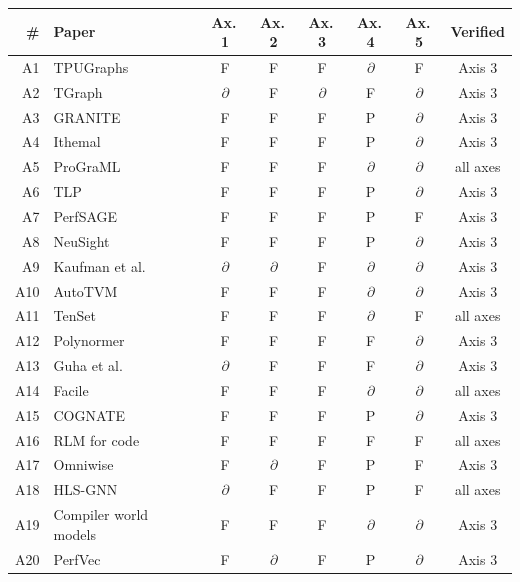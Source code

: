 \begin{tabular}{rlcccccc}
\toprule
\# & Paper & Ax.\,1 & Ax.\,2 & Ax.\,3 & Ax.\,4 & Ax.\,5 & Verified \\
\midrule
A1 & TPUGraphs~\cite{phothilimthana2023tpugraphs} & F & F & F & $\partial$ & F & Axis 3 \\
A2 & TGraph~\cite{khizbullin2024graph} & $\partial$ & F & $\partial$ & F & $\partial$ & Axis 3 \\
A3 & GRANITE~\cite{sykora2022granite} & F & F & F & P & $\partial$ & Axis 3 \\
A4 & Ithemal~\cite{mendis2019ithemal} & F & F & F & P & $\partial$ & Axis 3 \\
A5 & ProGraML~\cite{cummins2021programl} & F & F & F & $\partial$ & $\partial$ & all axes \\
A6 & TLP~\cite{zhai2022deep} & F & F & F & P & $\partial$ & Axis 3 \\
A7 & PerfSAGE~\cite{chai2023perfsage} & F & F & F & P & F & Axis 3 \\
A8 & NeuSight~\cite{lee2024forecasting} & F & F & F & P & $\partial$ & Axis 3 \\
A9 & Kaufman et al.~\cite{kaufman2021learned} & $\partial$ & $\partial$ & F & $\partial$ & $\partial$ & Axis 3 \\
A10 & AutoTVM~\cite{chen2018learning} & F & F & F & $\partial$ & $\partial$ & Axis 3 \\
A11 & TenSet~\cite{zheng2021tenset} & F & F & F & $\partial$ & F & all axes \\
A12 & Polynormer~\cite{deng2024polynormer} & F & F & F & F & $\partial$ & Axis 3 \\
A13 & Guha et al.~\cite{guha2025learned} & $\partial$ & F & F & F & $\partial$ & Axis 3 \\
A14 & Facile~\cite{abel2023facile} & F & F & F & $\partial$ & $\partial$ & all axes \\
A15 & COGNATE~\cite{sudusinghe2025cognate} & F & F & F & P & $\partial$ & Axis 3 \\
A16 & RLM for code~\cite{akhauri2025regression} & F & F & F & F & F & all axes \\
A17 & Omniwise~\cite{wang2025omniwise} & F & $\partial$ & F & P & F & Axis 3 \\
A18 & HLS-GNN~\cite{wu2022highlevel} & $\partial$ & F & F & P & F & all axes \\
A19 & Compiler world models~\cite{pan2026toward} & F & F & F & $\partial$ & $\partial$ & Axis 3 \\
A20 & PerfVec~\cite{li2024learning} & F & $\partial$ & F & P & $\partial$ & Axis 3 \\
\bottomrule
\end{tabular}
